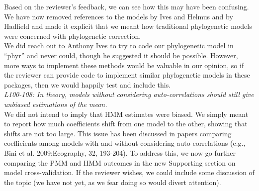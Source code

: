 \documentclass[11pt]{article}
\begin{document}
Based on the reviewer's feedback, we can see how this may have been confusing. We have now removed references to the models by Ives and Helmus and by Hadfield and made it explicit that we meant how traditional phylogenetic models were concerned with phylogenetic correction.\\

We did reach out to Anthony Ives to try to code our phylogenetic model in ``phyr'' and never could, though he suggested it should be possible. However, more ways to implement these methods would be valuable in our opinion, so if the reviewer can provide code to implement similar phylogenetic models in these packages, then we would happily test and include this.\\


\emph{L100-108: In theory, models without considering auto-correlations should still give unbiased estimations of the mean.}\\

We did not intend to imply that HMM estimates were biased. We simply meant to report how much coefficients shift from one model to the other, showing that shifts are not too large. This issue has been discussed in papers comparing coefficients among models with and without considering auto-correlations (e.g., Bini et al. 2009:Ecography, 32, 193-204). To address this, we now go further comparing the PMM and HMM outcomes in the new Supporting section on model cross-validation. If the reviewer wishes, we could include some discussion of the topic (we have not yet, as we fear doing so would divert attention). 
\end{document}
